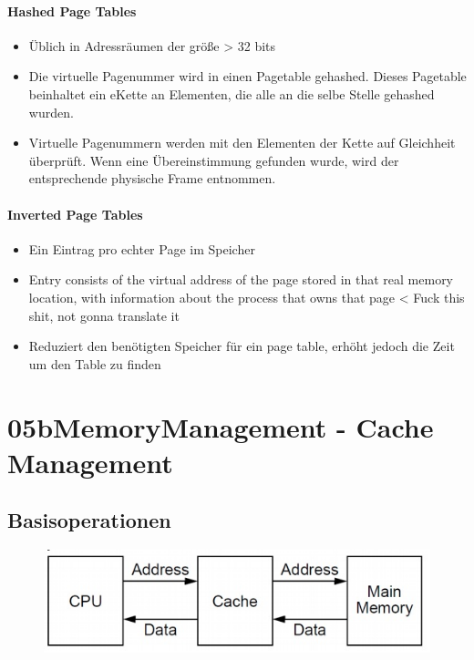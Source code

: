 \documentclass[a4paper]{scrreprt}
\begin{document}
\subsubsection{Hashed Page Tables}
\begin{itemize}
\item Üblich in Adressräumen der größe > 32 bits
\item Die virtuelle Pagenummer wird in einen Pagetable gehashed. Dieses Pagetable beinhaltet ein eKette an Elementen, die alle an die selbe Stelle gehashed wurden.
\item Virtuelle Pagenummern werden mit den Elementen der Kette auf Gleichheit überprüft. Wenn eine Übereinstimmung gefunden wurde, wird der entsprechende physische Frame entnommen.
\end{itemize}

\subsubsection{Inverted Page Tables}
\begin{itemize}
\item Ein Eintrag pro echter Page im Speicher
\item Entry consists of the virtual address of the page stored in that real 
memory location, with information about the process that owns that 
page < Fuck this shit, not gonna translate it
\item Reduziert den benötigten Speicher für ein page table, erhöht jedoch die Zeit um den Table zu finden

\end{itemize}
\chapter{05bMemoryManagement - Cache Management}
\section{Basisoperationen}
\begin{figure}[ht]
\centering
\includegraphics[scale=0.4]{operation.png}
\end{figure}
\end{document}
